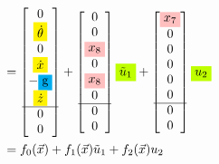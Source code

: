 \documentclass[12pt]{article}
\begin{document}
\begin{align*}
    &= \begin{bmatrix}
        0 \\
        \colorbox{yellow}{$\dot{\theta}$} \\
        0 \\
        \colorbox{yellow}{$\dot{x}$} \\
        -\colorbox{cyan}{g} \\
        \colorbox{yellow}{$\dot{z}$} \\
        \hline
        0 \\
        0 \\
    \end{bmatrix} +  \begin{bmatrix}
        0 \\
        0 \\
        \colorbox{pink}{$x_8$} \\
        0 \\
        \colorbox{pink}{$x_8$} \\
        0 \\
        \hline
        0 \\
        0 \\
    \end{bmatrix} \colorbox{lime}{$\tilde{u}_1$} + \begin{bmatrix}
        \colorbox{pink}{$x_7$} \\
        0 \\
        0 \\
        0 \\
        0 \\
        0 \\ 
        \hline
        0 \\
        0 \\
    \end{bmatrix} \colorbox{lime}{$u_2$} \\
    &= f_0(\vec{x}) + f_1(\vec{x}) \tilde{u}_1 + f_2(\vec{x}) u_2
\end{align*}
\end{document}
